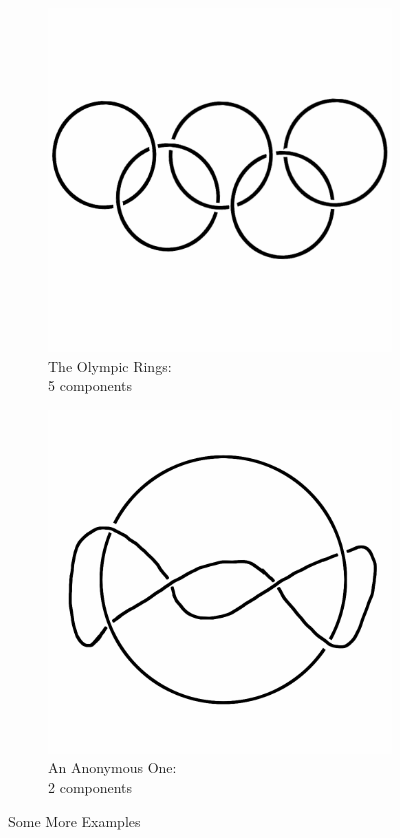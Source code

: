 \documentclass[12pt,letterpaper]{article}
\theoremstyle{definition}
\begin{document}
\begin{figure}[h]
\begin{subfigure}{.3\textwidth}
        \includegraphics[width=\textwidth]{knotpics/olympic.png}
        \caption{The Olympic Rings:\\ \phantom{space} 5 components}
    \end{subfigure}
    \quad
    \begin{subfigure}{.3\textwidth}
        \centering
        \includegraphics[width=\textwidth]{knotpics/saturntwist.png}
        \caption{An Anonymous One:\\ \phantom{space} 2 components}
    \end{subfigure}
    \caption{Some More Examples}
\end{figure}
\end{document}
